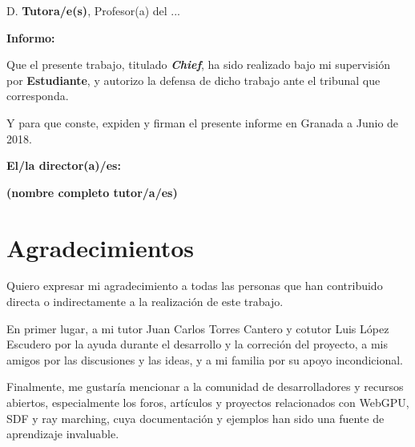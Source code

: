 D. \textbf{Tutora/e(s)}, Profesor(a) del ...

\vspace{0.5cm}

\textbf{Informo:}

\vspace{0.5cm}

Que el presente trabajo, titulado \textit{\textbf{Chief}},
ha sido realizado bajo mi supervisión por \textbf{Estudiante}, y autorizo la defensa de dicho trabajo ante el tribunal
que corresponda.

\vspace{0.5cm}

Y para que conste, expiden y firman el presente informe en Granada a Junio de 2018.

\vspace{1cm}

\textbf{El/la director(a)/es: }

\vspace{5cm}

\noindent \textbf{(nombre completo tutor/a/es)}

\chapter*{Agradecimientos}
Quiero expresar mi agradecimiento a todas las personas que han contribuido directa o indirectamente a la realización de este trabajo.\break

En primer lugar, a mi tutor Juan Carlos Torres Cantero y cotutor Luis López Escudero por la ayuda durante el desarrollo y la correci\'on del proyecto,
a mis amigos por las discusiones y las ideas, y a mi familia por su apoyo incondicional.\break

 Finalmente, me gustaría mencionar a la comunidad de desarrolladores y recursos abiertos, especialmente los foros, artículos y proyectos relacionados con WebGPU, SDF y ray marching,
 cuya documentación y ejemplos han sido una fuente de aprendizaje invaluable.




